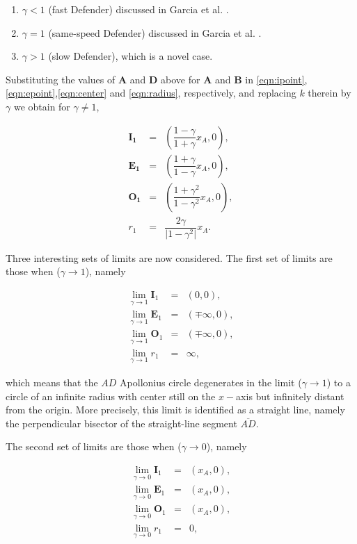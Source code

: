 \documentclass[final,5p,times,twocolumn]{elsarticle}
\begin{document}
\begin{enumerate}
\item $\gamma<1$ (fast Defender) discussed in Garcia et al. \cite{garcia2015active}.
\item $\gamma =1$ (same-speed Defender) discussed in Garcia et al. \cite{pachter2014active, garcia2015escape}.
\item $\gamma>1$ (slow Defender), which is a novel case. 
\end{enumerate}

Substituting the values of $\boldsymbol{A}$ and $\boldsymbol{D}$ above for $\boldsymbol{A}$ and $\boldsymbol{B}$ in \eqref{eqn:ipoint},\eqref{eqn:epoint},\eqref{eqn:center} and \eqref{eqn:radius}, respectively, and replacing $k$ therein by $\gamma$ we obtain for $\gamma\neq1$,

\begin{eqnarray}
\boldsymbol{I_{1}} &=& (\dfrac{1-\gamma}{1+\gamma}x_{A},0),\\
\boldsymbol{E_{1}} &=& (\dfrac{1+\gamma}{1-\gamma}x_{A},0),\\
\boldsymbol{O_{1}} &=& (\dfrac{1+\gamma^{2}}{1-\gamma^{2}}x_{A},0),\\
\label{O1}
r_{1} &=& \dfrac{2\gamma}{\lvert1-\gamma^{2}\rvert}x_{A}.
\label{r1}
\end{eqnarray}

Three interesting sets of limits are now considered. The first set of limits are those when ($\gamma\to1$), namely 

\begin{eqnarray}
\lim_{\gamma\to1} \boldsymbol{I}_1 &=& (0,0),\\
\lim_{\gamma\to1} \boldsymbol{E}_1 &=& (\mp\infty,0),\\
\lim_{\gamma\to1} \boldsymbol{O}_1 &=& (\mp\infty,0),\\
\lim_{\gamma\to1} r_1 &=& \infty,
\end{eqnarray}

which means that the $AD$ Apollonius circle degenerates in the limit ($\gamma\to1$) to a circle of an infinite radius with center still on the $x-$axis but infinitely distant from the origin. More precisely, this limit is identified as a straight line, namely the perpendicular bisector of the straight-line segment $\overline{AD}$.

The second set of limits are those when ($\gamma\to0$), namely 

\begin{eqnarray}
\lim_{\gamma\to0} \boldsymbol{I}_1 &=& (x_A,0),\\
\lim_{\gamma\to0} \boldsymbol{E}_1 &=& (x_A,0),\\
\lim_{\gamma\to0} \boldsymbol{O}_1 &=& (x_A,0),\\
\lim_{\gamma\to0} r_1 &=& 0,
\end{eqnarray}
\end{document}
